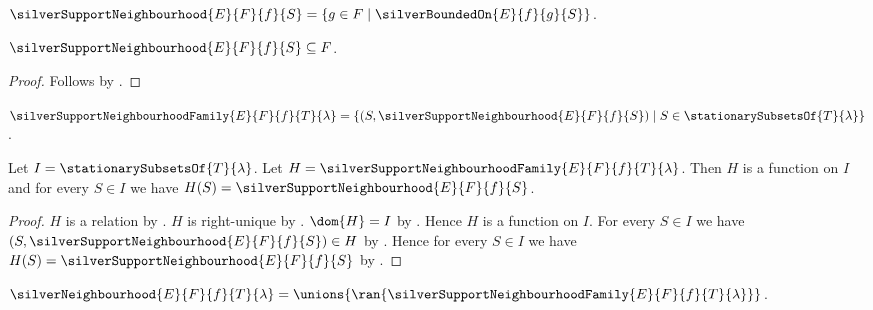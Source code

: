 \begin{definition}\label{silver_support_neighbourhood}
    $\silverSupportNeighbourhood{E}{F}{f}{S}
        =\{g\in F\mid \silverBoundedOn{E}{f}{g}{S}\}$.
\end{definition}

\begin{proposition}\label{silver_support_neighbourhood_subseteq}
    $\silverSupportNeighbourhood{E}{F}{f}{S}\subseteq F$.
\end{proposition}
\begin{proof}
    Follows by .
\end{proof}

\begin{definition}\label{silver_support_neighbourhood_family}
    $\silverSupportNeighbourhoodFamily{E}{F}{f}{T}{\lambda}
        =\{(S,\silverSupportNeighbourhood{E}{F}{f}{S})
            \mid S\in\stationarySubsetsOf{T}{\lambda}\}$.
\end{definition}

\begin{proposition}\label{silver_support_neighbourhood_family_type}
    Let $I=\stationarySubsetsOf{T}{\lambda}$.
    Let $H=\silverSupportNeighbourhoodFamily{E}{F}{f}{T}{\lambda}$.
    Then $H$ is a function on $I$ and
        for every $S\in I$ we have
            $H(S)=\silverSupportNeighbourhood{E}{F}{f}{S}$.
\end{proposition}
\begin{proof}
    $H$ is a relation
        by .
    $H$ is right-unique by
        .
    $\dom{H}=I$ by
        .
    Hence $H$ is a function on $I$.
    For every $S\in I$ we have
        $(S,\silverSupportNeighbourhood{E}{F}{f}{S})\in H$
        by .
    Hence for every $S\in I$ we have
        $H(S)=\silverSupportNeighbourhood{E}{F}{f}{S}$
        by .
\end{proof}

\begin{definition}\label{silver_neighbourhood}
    $\silverNeighbourhood{E}{F}{f}{T}{\lambda}
        =\unions{\ran{
            \silverSupportNeighbourhoodFamily{E}{F}{f}{T}{\lambda}}}$.
\end{definition}

